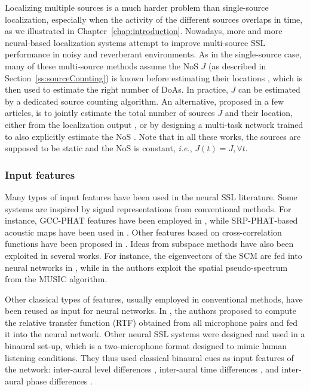 Localizing multiple sources is a much harder problem than single-source localization, especially when the activity of the different sources overlaps in time, as we illustrated in Chapter~\ref{chap:introduction}. Nowadays, more and more neural-based localization systems attempt to improve multi-source SSL performance in noisy and reverberant environments. As in the single-source case, many of these multi-source methods assume the NoS $J$ (as described in Section~\ref{ss:sourceCounting}) is known before estimating their locations \cite{hirvonen_classication_2015, chakrabarty_multi-speaker_2017, ma_phased_2018, perotin_crnn-based_2019}, which is then used to estimate the right number of DoAs. In practice, $J$ can be estimated by a dedicated source counting algorithm. An alternative, proposed in a few articles, is to jointly estimate the total number of sources $J$ and their location, either from the localization output \cite{he_joint_2018,moing_learning_2020,sundar_raw_2020}, or by designing a multi-task network trained to also explicitly estimate the NoS \cite{nguyen_robust_2020}. Note that in all these works, the sources are supposed to be static and the NoS is constant, \emph{i.e.}, $J(t) = J, \forall t$.

\subsubsection{Input features}

Many types of input features have been used in the neural SSL literature. Some systems are inspired by signal representations from conventional methods. For instance, GCC-PHAT features have been employed in \cite{xiao_learning-based_2015, vesperini_neural_2016, he_deep_2018, comanducci_source_2020}, while SRP-PHAT-based acoustic maps have been used in \cite{salvati_exploiting_2018, diaz-guerra_robust_2021}. Other features based on cross-correlation functions have been proposed in \cite{grondin_sound_2019, ma_phased_2018}. Ideas from subspace methods have also been exploited in several works. For instance, the eigenvectors of the SCM are fed into neural networks in \cite{takeda_discriminative_2016, takeda_unsupervised_2018}, while in \cite{nguyen_robust_2020} the authors exploit the spatial pseudo-spectrum from the MUSIC algorithm.

Other classical types of features, usually employed in conventional methods, have been reused as input for neural networks. In \cite{chazan_multi-microphone_2019, bianco_semi-supervised_2020}, the authors proposed to compute the relative transfer function (RTF) obtained from all microphone pairs and fed it into the neural network. Other neural SSL systems were designed and used in a binaural set-up, which is a two-microphone format designed to mimic human listening conditions. They thus used classical binaural cues as input features of the network: inter-aural level differences \cite{youssef_learning-based_2013, roden_sound_2015, zermini_deep_2016}, inter-aural time differences \cite{youssef_learning-based_2013, roden_sound_2015}, and  inter-aural phase differences \cite{pak_sound_2019, nguyen_autonomous_2018, sivasankaran_keyword-based_2018, shimada_accdoa_2020, subramanian_deep_2021}.

